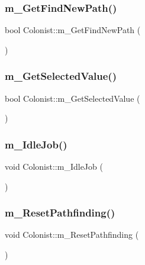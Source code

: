 \subsubsection{\texorpdfstring{m\+\_\+\+Get\+Find\+New\+Path()}{m\_GetFindNewPath()}}
{\footnotesize\ttfamily bool Colonist\+::m\+\_\+\+Get\+Find\+New\+Path (\begin{DoxyParamCaption}{ }\end{DoxyParamCaption})}

\mbox{\label{class_colonist_ac2c3826ecc02ac228cb6c829a1ab2203}} 
\subsubsection{\texorpdfstring{m\+\_\+\+Get\+Selected\+Value()}{m\_GetSelectedValue()}}
{\footnotesize\ttfamily bool Colonist\+::m\+\_\+\+Get\+Selected\+Value (\begin{DoxyParamCaption}{ }\end{DoxyParamCaption})}

\mbox{\label{class_colonist_a9f7d167546dbc3cbbf79e9a8fdbb2c98}} 
\subsubsection{\texorpdfstring{m\+\_\+\+Idle\+Job()}{m\_IdleJob()}}
{\footnotesize\ttfamily void Colonist\+::m\+\_\+\+Idle\+Job (\begin{DoxyParamCaption}{ }\end{DoxyParamCaption})}

\mbox{\label{class_colonist_ad137e98744bc418674f853a0c19d72a3}} 
\subsubsection{\texorpdfstring{m\+\_\+\+Reset\+Pathfinding()}{m\_ResetPathfinding()}}
{\footnotesize\ttfamily void Colonist\+::m\+\_\+\+Reset\+Pathfinding (\begin{DoxyParamCaption}{ }\end{DoxyParamCaption})}

